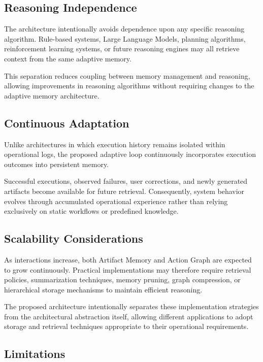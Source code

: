 \subsection{Reasoning Independence}

The architecture intentionally avoids dependence upon any specific reasoning algorithm. Rule-based systems, Large Language Models, planning algorithms, reinforcement learning systems, or future reasoning engines may all retrieve context from the same adaptive memory.

This separation reduces coupling between memory management and reasoning, allowing improvements in reasoning algorithms without requiring changes to the adaptive memory architecture.

\subsection{Continuous Adaptation}

Unlike architectures in which execution history remains isolated within operational logs, the proposed adaptive loop continuously incorporates execution outcomes into persistent memory.

Successful executions, observed failures, user corrections, and newly generated artifacts become available for future retrieval. Consequently, system behavior evolves through accumulated operational experience rather than relying exclusively on static workflows or predefined knowledge.

\subsection{Scalability Considerations}

As interactions increase, both Artifact Memory and Action Graph are expected to grow continuously. Practical implementations may therefore require retrieval policies, summarization techniques, memory pruning, graph compression, or hierarchical storage mechanisms to maintain efficient reasoning.

The proposed architecture intentionally separates these implementation strategies from the architectural abstraction itself, allowing different applications to adopt storage and retrieval techniques appropriate to their operational requirements.

\subsection{Limitations}

